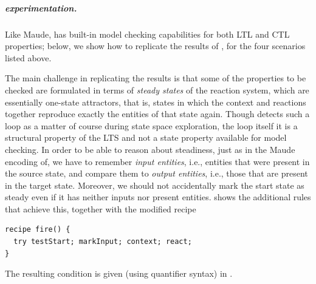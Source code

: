 \subparagraph*{\GROOVE experimentation.}

Like Maude, \GROOVE has built-in model checking capabilities for both LTL and CTL properties; below, we show how to replicate the results of \cite{DBLP:conf/cmsb/BallisBFO24}, for the four scenarios listed above.

The main challenge in replicating the results is that some of the properties to be checked are formulated in terms of \emph{steady states} of the reaction system, which are essentially one-state attractors, that is, states in which the context and reactions together reproduce exactly the entities of that state again. Though \GROOVE detects such a loop as a matter of course during state space exploration, the loop itself it is a structural property of the LTS and not a state property available for model checking. In order to be able to reason about steadiness, just as in the Maude encoding of\cite{DBLP:conf/cmsb/BallisBFO24}, we have to remember \emph{input entities}, i.e., entities that were present in the source state, and compare them to \emph{output entities}, i.e., those that are present in the target state. Moreover, we should not accidentally mark the start state as steady even if it has neither inputs nor present entities.  shows the additional rules that achieve this, together with the modified recipe
%
\begin{lstlisting}
recipe fire() {
  try testStart; markInput; context; react;
}
\end{lstlisting}
%
The resulting \steadyR condition is given (using quantifier syntax) in .


